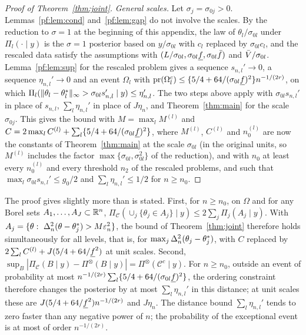 \begin{proof}[Proof of Theorem~\ref{thm:joint}]
\emph{General scales.} Let $\sigma_j=\sigma_{0j}>0$. Lemmas~\ref{pf:lem:cond} and~\ref{pf:lem:gap} do not involve the scales. By the reduction to $\sigma=1$ at the beginning of this appendix, the law of $\theta_l/\sigma_{0l}$ under $\Pi_l(\cdot\mid y)$ is the $\sigma=1$ posterior based on $y/\sigma_{0l}$ with $c_l$ replaced by $\sigma_{0l}c_l$, and the rescaled data satisfy the assumptions with $(L/\sigma_{0l},\sigma_{0l}\underline f,\sigma_{0l}\bar f)$ and $\bar V/\sigma_{0l}$. Lemma~\ref{pf:lem:sup} for the rescaled problem gives a sequence $s_{n,l}'\to0$, a sequence $\eta_{n,l}'\to0$ and an event $\Omega_l$ with $\mathrm{pr}(\Omega_l^c)\le\{5/4+64/(\sigma_{0l}\underline f)^2\}n^{-1/(2r)}$, on which $\Pi_l(\|\theta_l-\theta^{*}_l\|_\infty>\sigma_{0l}s_{n,l}'\mid y)\le\eta_{n,l}'$. The two steps above apply with $\sigma_{0l}s_{n,l}'$ in place of $s_{n,l}$, $\sum_l\eta_{n,l}'$ in place of $J\eta_n$, and Theorem~\ref{thm:main} for the scale $\sigma_{0j}$. This gives the bound with $M=\max_lM^{(l)}$ and $C=2\max_lC^{(l)}+\sum_l\{5/4+64/(\sigma_{0l}\underline f)^2\}$, where $M^{(l)}$, $C^{(l)}$ and $n_0^{(l)}$ are now the constants of Theorem~\ref{thm:main} at the scale $\sigma_{0l}$ (in the original units, so $M^{(l)}$ includes the factor $\max\{\sigma_{0l},\sigma_{0l}^2\}$ of the reduction), and with $n_0$ at least every $n_0^{(l)}$ and every threshold $n_2$ of the rescaled problems, and such that $\max_l\sigma_{0l}s_{n,l}'\le g_0/2$ and $\sum_l\eta_{n,l}'\le1/2$ for $n\ge n_0$.
\end{proof}

The proof gives slightly more than is stated. First, for $n\ge n_0$, on $\Omega$ and for any Borel sets $A_1,\dots,A_J\subset\mathbb{R}^n$, $\Pi_{\mathcal C}(\cup_j\{\theta_j\in A_j\}\mid y)\le2\sum_j\Pi_j(A_j\mid y)$. With $A_j=\{\theta:\ \Delta_n^2(\theta-\thetas_j)>M\en^2\}$, the bound of Theorem~\ref{thm:joint} therefore holds simultaneously for all levels, that is, for $\max_j\Delta_n^2(\theta_j-\theta^{*}_j)$, with $C$ replaced by $2\sum_lC^{(l)}+J(5/4+64/\underline f^2)$ at unit scales. Second, $\sup_B|\Pi_{\mathcal C}(B\mid y)-\Pi^{\otimes}(B\mid y)|=\Pi^{\otimes}(\mathcal C^c\mid y)$. For $n\ge n_0$, outside an event of probability at most $n^{-1/(2r)}\sum_l\{5/4+64/(\sigma_{0l}\underline f)^2\}$, the ordering constraint therefore changes the posterior by at most $\sum_l\eta_{n,l}'$ in this distance; at unit scales these are $J(5/4+64/\underline f^2)n^{-1/(2r)}$ and $J\eta_n$. The distance bound $\sum_l\eta_{n,l}'$ tends to zero faster than any negative power of $n$; the probability of the exceptional event is at most of order $n^{-1/(2r)}$.
